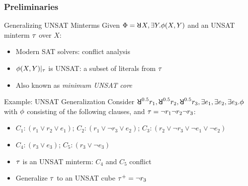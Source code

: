 \begin{frame}
    \frametitle{Preliminaries}
    \begin{block}{Generalizing UNSAT Minterms}
        Given $\Qf=\random{} X,\exists Y.\pf(X,Y)$ and an UNSAT minterm $\tau$ over $X$:
        \pause
        \begin{itemize}
            \item Modern SAT solvers: conflict analysis
                  \pause
            \item $\phi(X,Y)|_{\tau}$ is UNSAT: a subset of literals from $\tau$
                  \pause
            \item Also known as \textit{minimum UNSAT core}
                  \pause
        \end{itemize}
    \end{block}
    \begin{block}{Example: UNSAT Generalization}
        Consider $\random{0.5}r_1,\random{0.5}r_2,\random{0.5}r_3,\exists e_1,\exists e_2,\exists e_3.\pf$ with $\phi$ consisting of the following clauses, and $\tau=\lnot r_1\lnot r_2\lnot r_3$:
        \begin{itemize}
            \item[] $C_1: (r_1 \lor r_2 \lor e_1)$; $C_2: (r_1 \lor \lnot r_3 \lor e_2)$; $C_3: (r_2 \lor \lnot r_3 \lor \lnot e_1 \lor \lnot e_2)$
            \item[] $C_4: (r_3 \lor e_3)$; $C_5: (r_3 \lor \lnot e_3)$
                  \pause
        \end{itemize}
        \begin{itemize}
            \item $\tau$ is an UNSAT minterm: $C_4$ and $C_5$ conflict
                  \pause
            \item Generalize $\tau$ to an UNSAT cube $\tau^+=\lnot r_3$
        \end{itemize}
    \end{block}
\end{frame}